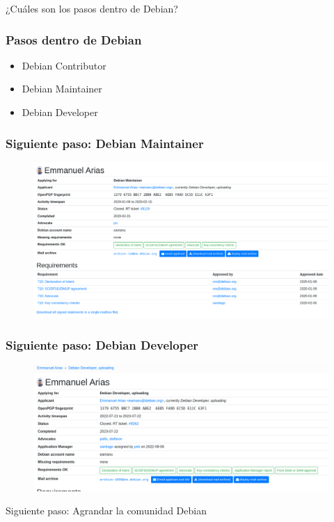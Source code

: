 \documentclass{beamer}
\begin{document}
\begin{frame}
  \centering
  \Huge ¿Cuáles son los pasos dentro de Debian?
\end{frame}

\begin{frame}
  \frametitle {Pasos dentro de Debian}
  \begin{itemize}
    \item Debian Contributor \pause
    \item Debian Maintainer \pause
    \item Debian Developer
  \end{itemize}
\end{frame}

\begin{frame}
  \frametitle {Siguiente paso: Debian Maintainer}
      \begin{figure}
		\centering
		\includegraphics[width=0.7\linewidth]{images/DM}
		\label{fig:dm}
	\end{figure}
\end{frame}

\begin{frame}
  \frametitle {Siguiente paso: Debian Developer}
      \begin{figure}
		\centering
		\includegraphics[width=0.7\linewidth]{images/dd}
		\label{fig:dd}
	\end{figure}
\end{frame}

\begin{frame}
  \centering
  \Huge Siguiente paso: Agrandar la comunidad Debian
\end{frame}
\end{document}
